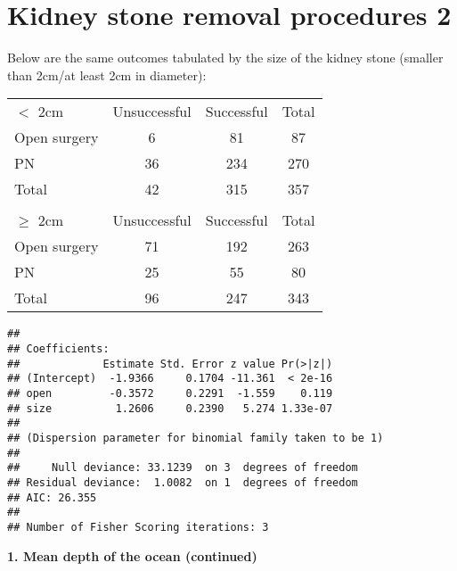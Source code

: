 \documentclass[10pt,handout]{beamer}\usepackage[]{graphicx}\usepackage[]{color}
\makeatletter
\newenvironment{kframe}{%
 \def\at@end@of@kframe{}%
 \ifinner\ifhmode%
  \def\at@end@of@kframe{\end{minipage}}%
  \begin{minipage}{\columnwidth}%
 \fi\fi%
 \def\FrameCommand##1{\hskip\@totalleftmargin \hskip-\fboxsep
 \colorbox{shadecolor}{##1}\hskip-\fboxsep
     \hskip-\linewidth \hskip-\@totalleftmargin \hskip\columnwidth}%
 \MakeFramed {\advance\hsize-\width
   \@totalleftmargin\z@ \linewidth\hsize
   \@setminipage}}%
 {\par\unskip\endMakeFramed%
 \at@end@of@kframe}
\newenvironment{knitrout}{}{} %
\makeatother
\begin{document}
\section{Kidney stone removal procedures 2}

\begin{frame}
\vspace{-.91in}
\tiny
Below are the same outcomes tabulated by the size of the kidney stone (smaller than 2cm/at least 2cm in diameter):

\begin{table}[h]
	\centering
	\begin{tabular}{lcc|c}
		$<$ 2cm & Unsuccessful &  Successful & Total\\
		Open surgery & 6 & 81 & 87 \\
		PN 			 & 36 & 234 & 270 \\
		\hline
		Total 	& 42 & 315 & 357 \\
		& & &  \\
		$\geq$ 2cm & Unsuccessful &  Successful & Total\\
		Open surgery & 71 & 192 & 263 \\
		PN 			 & 25 & 55 & 80 \\
		\hline
		Total 		& 96 & 247 & 343
	\end{tabular}
\end{table}

\vspace{-.21in}
\begin{knitrout}\tiny
{}\color{fgcolor}\begin{kframe}
\begin{verbatim}
## 
## Coefficients:
##             Estimate Std. Error z value Pr(>|z|)
## (Intercept)  -1.9366     0.1704 -11.361  < 2e-16
## open         -0.3572     0.2291  -1.559    0.119
## size          1.2606     0.2390   5.274 1.33e-07
## 
## (Dispersion parameter for binomial family taken to be 1)
## 
##     Null deviance: 33.1239  on 3  degrees of freedom
## Residual deviance:  1.0082  on 1  degrees of freedom
## AIC: 26.355
## 
## Number of Fisher Scoring iterations: 3
\end{verbatim}
\end{kframe}
\end{knitrout}
\end{frame}

\begin{frame}
	\vspace*{-5.0in}
	\textbf{1. Mean depth of the ocean (continued)}
	
\end{frame}
\end{document}
